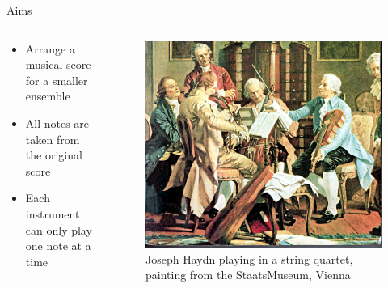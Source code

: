 \documentclass{beamer}
\begin{document}
\begin{frame}{Aims}

    \begin{columns}
        \begin{column}{.6\textwidth}
            \begin{itemize}[<+(1)->]
                \item Arrange a musical score for a smaller ensemble
                \item All notes are taken from the original score
                \item Each instrument can only play one note at a time
            \end{itemize}
        \end{column}
        \begin{column}{.4\textwidth}
            \begin{figure}
                \includegraphics[width=\textwidth]{string-quartet.jpg}
                \caption{Joseph Haydn playing in a string quartet,\\painting from the StaatsMuseum, Vienna}
            \end{figure}
        \end{column}
    \end{columns}

\end{frame}
\end{document}
